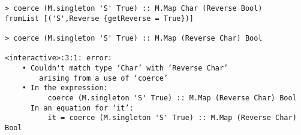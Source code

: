 \begin{repl}\begin{lstlisting}
> coerce (M.singleton 'S' True) :: M.Map Char (Reverse Bool)
fromList [('S',Reverse {getReverse = True})]

> coerce (M.singleton 'S' True) :: M.Map (Reverse Char) Bool

<interactive>:3:1: error:
    • Couldn't match type ‘Char’ with ‘Reverse Char’
        arising from a use of ‘coerce’
    • In the expression:
          coerce (M.singleton 'S' True) :: M.Map (Reverse Char) Bool
      In an equation for ‘it’:
          it = coerce (M.singleton 'S' True) :: M.Map (Reverse Char) Bool\end{lstlisting}\end{repl}
